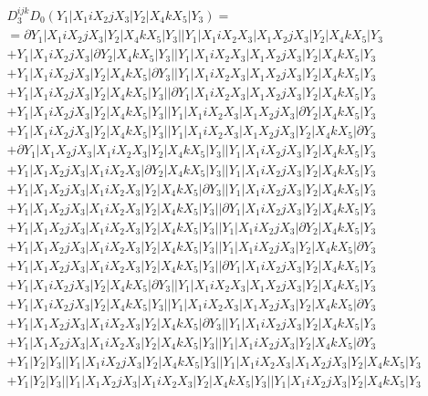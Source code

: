 \documentclass{article}[12pt]
\begin{document}
\begin{align*}
& D_3^{ijk}D_0(Y_1|X_1iX_2jX_3|Y_2|X_4kX_5|Y_3) = \\
& =\partial Y_1|X_1iX_2jX_3|Y_2|X_4kX_5|Y_3||Y_1|X_1iX_2X_3|X_1X_2jX_3|Y_2|X_4kX_5|Y_3\\ 
& +Y_1|X_1iX_2jX_3|\partial Y_2|X_4kX_5|Y_3||Y_1|X_1iX_2X_3|X_1X_2jX_3|Y_2|X_4kX_5|Y_3\\ 
& +Y_1|X_1iX_2jX_3|Y_2|X_4kX_5|\partial Y_3||Y_1|X_1iX_2X_3|X_1X_2jX_3|Y_2|X_4kX_5|Y_3\\ 
& +Y_1|X_1iX_2jX_3|Y_2|X_4kX_5|Y_3||\partial Y_1|X_1iX_2X_3|X_1X_2jX_3|Y_2|X_4kX_5|Y_3\\ 
& +Y_1|X_1iX_2jX_3|Y_2|X_4kX_5|Y_3||Y_1|X_1iX_2X_3|X_1X_2jX_3|\partial Y_2|X_4kX_5|Y_3\\ 
& +Y_1|X_1iX_2jX_3|Y_2|X_4kX_5|Y_3||Y_1|X_1iX_2X_3|X_1X_2jX_3|Y_2|X_4kX_5|\partial Y_3\\  
& +\partial Y_1|X_1X_2jX_3|X_1iX_2X_3|Y_2|X_4kX_5|Y_3||Y_1|X_1iX_2jX_3|Y_2|X_4kX_5|Y_3\\
& +Y_1|X_1X_2jX_3|X_1iX_2X_3|\partial Y_2|X_4kX_5|Y_3||Y_1|X_1iX_2jX_3|Y_2|X_4kX_5|Y_3\\ 
& +Y_1|X_1X_2jX_3|X_1iX_2X_3|Y_2|X_4kX_5|\partial Y_3||Y_1|X_1iX_2jX_3|Y_2|X_4kX_5|Y_3\\
& +Y_1|X_1X_2jX_3|X_1iX_2X_3|Y_2|X_4kX_5|Y_3||\partial Y_1|X_1iX_2jX_3|Y_2|X_4kX_5|Y_3\\
& +Y_1|X_1X_2jX_3|X_1iX_2X_3|Y_2|X_4kX_5|Y_3||Y_1|X_1iX_2jX_3|\partial Y_2|X_4kX_5|Y_3\\
& +Y_1|X_1X_2jX_3|X_1iX_2X_3|Y_2|X_4kX_5|Y_3||Y_1|X_1iX_2jX_3|Y_2|X_4kX_5|\partial Y_3\\
 & +Y_1|X_1X_2jX_3|X_1iX_2X_3|Y_2|X_4kX_5|Y_3||\partial Y_1|X_1iX_2jX_3|Y_2|X_4kX_5|Y_3\\ 
 & +Y_1|X_1iX_2jX_3|Y_2|X_4kX_5|\partial Y_3||Y_1|X_1iX_2X_3|X_1X_2jX_3|Y_2|X_4kX_5|Y_3\\ 
 & +Y_1|X_1iX_2jX_3|Y_2|X_4kX_5|Y_3||Y_1|X_1iX_2X_3|X_1X_2jX_3|Y_2|X_4kX_5|\partial Y_3\\ 
 & +Y_1|X_1X_2jX_3|X_1iX_2X_3|Y_2|X_4kX_5|\partial Y_3||Y_1|X_1iX_2jX_3|Y_2|X_4kX_5|Y_3\\ 
 & +Y_1|X_1X_2jX_3|X_1iX_2X_3|Y_2|X_4kX_5|Y_3||Y_1|X_1iX_2jX_3|Y_2|X_4kX_5|\partial Y_3\\ 
 & +Y_1|Y_2|Y_3||Y_1|X_1iX_2jX_3|Y_2|X_4kX_5|Y_3||Y_1|X_1iX_2X_3|X_1X_2jX_3|Y_2|X_4kX_5|Y_3\\ 
 & +Y_1|Y_2|Y_3||Y_1|X_1X_2jX_3|X_1iX_2X_3|Y_2|X_4kX_5|Y_3||Y_1|X_1iX_2jX_3|Y_2|X_4kX_5|Y_3\\ 

\end{align*}
\end{document}
